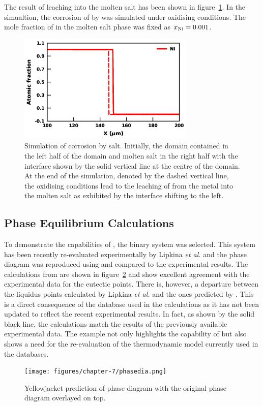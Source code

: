 The result of  leaching into the molten salt has been shown in figure~\ref{fig:pfres}. In the simualtion, the corrosion of  by  was simulated under oxidising conditions. The mole fraction of  in the molten salt phase was fixed as $x_{\ce{Ni}} = 0.001$.
\begin{figure}[h!]
        \centering
        \includegraphics[width=0.75\textwidth]{figures/chapter-7/pfres.png}
        \caption{Simulation of  corrosion by  salt. Initially, the domain contained  in the left half of the domain and molten salt in the right half with the interface shown by the solid vertical line at the centre of the domain. At the end of the simulation, denoted by the dashed vertical line, the oxidising conditions lead to the leaching of  from the metal into the molten salt as exhibited by the interface shifting to the left.}
        \label{fig:pfres}
    \end{figure}
       
\subsection{Phase Equilibrium Calculations}
    To demonstrate the capabilities of {\GEM}, the  binary system was selected. This system has been recently re-evaluated experimentally by Lipkina \textit{et al.} \cite{Lipkina:2022aa} and the phase diagram was reproduced using {\GEM} and compared to the experimental results. The calculations from {\YJ} are shown in figure~\ref{fig:res_phased} and show excellent agreement with the experimental data for the eutectic points. There is, however, a departure between the liquidus points calculated by Lipkina \textit{et al.} and the ones predicted by {\YJ}. This is a direct consequence of the database used in the calculations as it has not been updated to reflect the recent experimental results. In fact, as shown by the solid black line, the calculations match the results of the previously available experimental data. The example not only highlights the capability of {\GEM} but also shows a need for the re-evaluation of the  thermodynamic model currently used in the databases.
\begin{figure}
         \centering
         \texttt{[image: figures/chapter-7/phasedia.png]}
 	 \caption{Yellowjacket prediction of  phase diagram with the original phase diagram overlayed on top.}
	 \label{fig:res_phased}
\end{figure}
    
